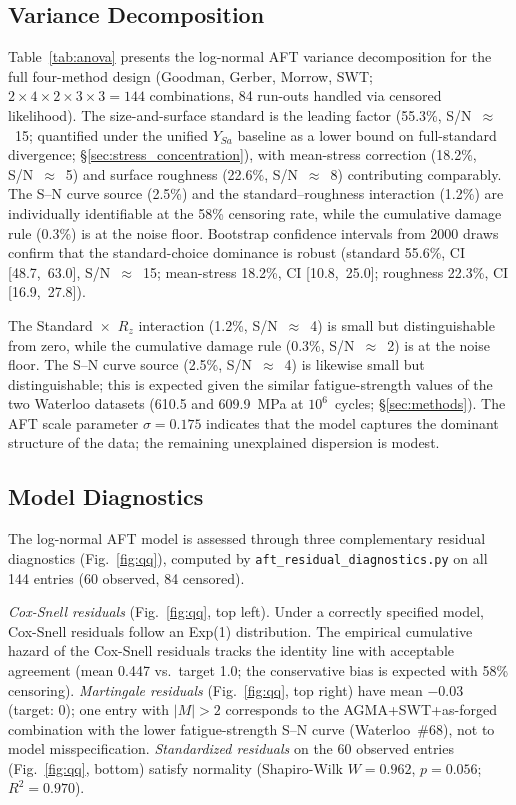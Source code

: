 \documentclass[twocolumn,12pt,a4paper]{article}
\begin{document}
\subsection{Variance Decomposition}

Table~\ref{tab:anova} presents the log-normal AFT variance
decomposition for the full four-method design (Goodman, Gerber,
Morrow, SWT; $2\times4\times2\times3\times3=144$ combinations,
84 run-outs handled via censored likelihood). The size-and-surface
standard is the leading factor (55.3\%, S/N~$\approx$~15; quantified
under the unified $Y_{Sa}$ baseline as a lower bound on full-standard
divergence; \S\ref{sec:stress_concentration}), with mean-stress
correction (18.2\%, S/N~$\approx$~5) and surface roughness (22.6\%,
S/N~$\approx$~8) contributing comparably. The S--N curve source
(2.5\%) and the standard--roughness interaction (1.2\%) are
individually identifiable at the 58\% censoring rate, while the
cumulative damage rule (0.3\%) is at the noise floor. Bootstrap
confidence intervals from 2000 draws confirm that the
standard-choice dominance is robust (standard 55.6\%, CI
[48.7,~63.0], S/N~$\approx$~15; mean-stress 18.2\%, CI
[10.8,~25.0]; roughness 22.3\%, CI [16.9,~27.8]).

The Standard~$\times$~$R_z$ interaction (1.2\%, S/N~$\approx$~4) is
small but distinguishable from zero, while the cumulative damage rule
(0.3\%, S/N~$\approx$~2) is at the noise floor. The S--N curve source
(2.5\%, S/N~$\approx$~4) is likewise small but distinguishable; this
is expected given the similar fatigue-strength values of the two
Waterloo datasets (610.5 and 609.9~MPa at $10^6$~cycles;
\S\ref{sec:methods}). The
AFT scale parameter $\sigma = 0.175$ indicates that the model
captures the dominant structure of the data; the remaining
unexplained dispersion is modest.

\subsection{Model Diagnostics}

The log-normal AFT model is assessed through three complementary
residual diagnostics (Fig.~\ref{fig:qq}), computed by
\texttt{aft\_residual\_diagnostics.py} on all 144 entries (60
observed, 84 censored).

\textit{Cox-Snell residuals} (Fig.~\ref{fig:qq}, top left). Under a
correctly specified model, Cox-Snell residuals follow an Exp(1)
distribution. The empirical cumulative hazard of the Cox-Snell
residuals tracks the identity line with acceptable agreement (mean
0.447 vs.\ target 1.0; the conservative bias is expected with 58\%
censoring). \textit{Martingale residuals} (Fig.~\ref{fig:qq}, top
right) have mean $-$0.03 (target: 0); one entry with $|M| > 2$
corresponds to the AGMA+SWT+as-forged combination with the lower
fatigue-strength S--N curve (Waterloo~\#68), not to model
misspecification. \textit{Standardized
residuals} on the 60 observed entries (Fig.~\ref{fig:qq}, bottom)
satisfy normality (Shapiro-Wilk $W=0.962$, $p=0.056$; $R^2=0.970$). %
\end{document}
